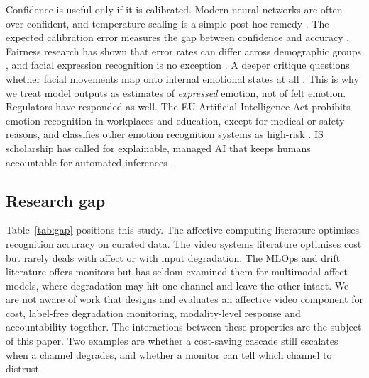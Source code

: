 Confidence is useful only if it is calibrated. Modern neural networks are often over-confident, and temperature scaling is a simple post-hoc remedy \citep{guo2017}. The expected calibration error measures the gap between confidence and accuracy \citep{naeini2015}. Fairness research has shown that error rates can differ across demographic groups \citep{hardt2016,mehrabi2021}, and facial expression recognition is no exception \citep{xu2020}. A deeper critique questions whether facial movements map onto internal emotional states at all \citep{barrett2019}. This is why we treat model outputs as estimates of \emph{expressed} emotion, not of felt emotion. Regulators have responded as well. The EU Artificial Intelligence Act prohibits emotion recognition in workplaces and education, except for medical or safety reasons, and classifies other emotion recognition systems as high-risk \citep{euaiact2024}. IS scholarship has called for explainable, managed AI that keeps humans accountable for automated inferences \citep{rai2020,berente2021,dwivedi2021}.

\subsection{Research gap}

Table~\ref{tab:gap} positions this study. The affective computing literature optimises recognition accuracy on curated data. The video systems literature optimises cost but rarely deals with affect or with input degradation. The MLOps and drift literature offers monitors but has seldom examined them for multimodal affect models, where degradation may hit one channel and leave the other intact. We are not aware of work that designs and evaluates an affective video component for cost, label-free degradation monitoring, modality-level response and accountability together. The interactions between these properties are the subject of this paper. Two examples are whether a cost-saving cascade still escalates when a channel degrades, and whether a monitor can tell which channel to distrust.

